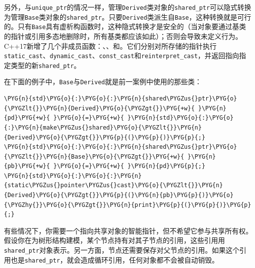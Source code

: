 
另外，与\texttt{unique\_\allowbreak{}ptr}的情况一样，管理\texttt{Derived}类对象的\texttt{shared\_\allowbreak{}ptr}可以隐式转换为管理\texttt{Base}类对象的\texttt{shared\_\allowbreak{}ptr}。只要\texttt{Derived}类派生自\texttt{Base}，这种转换就是可行的。只有\texttt{Base}具有虚析构函数时，这种隐式转换才是安全的（当对象要通过基类的指针或引用多态地删除时，所有基类都应该如此）；否则会导致未定义行为。C++17新增了几个非成员函数：、、和。它们分别对所存储的指针执行\texttt{static\_\allowbreak{}cast}、\texttt{dynamic\_\allowbreak{}cast}、\texttt{const\_\allowbreak{}cast}和\texttt{reinterpret\_\allowbreak{}cast}，并返回指向指定类型的新\texttt{shared\_\allowbreak{}ptr}。



在下面的例子中，\texttt{Base}与\texttt{Derived}就是前一案例中使用的那些类：



\begin{codeblockbg}
\begin{Verbatim}[commandchars=\\\{\},breaklines=true,breakanywhere=true,fontsize=\codefont,xleftmargin=17bp]
\PYG{n}{std}\PYG{o}{:}\PYG{o}{:}\PYG{n}{shared\PYGZus{}ptr}\PYG{o}{\PYGZlt{}}\PYG{n}{Derived}\PYG{o}{\PYGZgt{}}\PYG{+w}{ }\PYG{n}{pd}\PYG{+w}{ }\PYG{o}{=}\PYG{+w}{ }\PYG{n}{std}\PYG{o}{:}\PYG{o}{:}\PYG{n}{make\PYGZus{}shared}\PYG{o}{\PYGZlt{}}\PYG{n}{Derived}\PYG{o}{\PYGZgt{}}\PYG{p}{(}\PYG{p}{)}\PYG{p}{;}
\PYG{n}{std}\PYG{o}{:}\PYG{o}{:}\PYG{n}{shared\PYGZus{}ptr}\PYG{o}{\PYGZlt{}}\PYG{n}{Base}\PYG{o}{\PYGZgt{}}\PYG{+w}{ }\PYG{n}{pb}\PYG{+w}{ }\PYG{o}{=}\PYG{+w}{ }\PYG{n}{pd}\PYG{p}{;}
\PYG{n}{std}\PYG{o}{:}\PYG{o}{:}\PYG{n}{static\PYGZus{}pointer\PYGZus{}cast}\PYG{o}{\PYGZlt{}}\PYG{n}{Derived}\PYG{o}{\PYGZgt{}}\PYG{p}{(}\PYG{n}{pb}\PYG{p}{)}\PYG{o}{\PYGZhy{}}\PYG{o}{\PYGZgt{}}\PYG{n}{print}\PYG{p}{(}\PYG{p}{)}\PYG{p}{;}
\end{Verbatim}
\end{codeblockbg}



有些情况下，你需要一个指向共享对象的智能指针，但不希望它参与共享所有权。假设你在为树形结构建模，某个节点持有对其子节点的引用，这些引用用\texttt{shared\_\allowbreak{}ptr}对象表示。另一方面，节点还需要保存对父节点的引用。如果这个引用也是\texttt{shared\_\allowbreak{}ptr}，就会造成循环引用，任何对象都不会被自动销毁。


